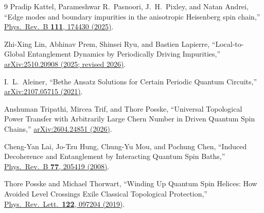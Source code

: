 \documentclass[10pt,a4paper]{article}
\begin{document}
\begin{thebibliography}{9}
Pradip Kattel, Parameshwar R.~Pasnoori, J.~H.~Pixley, and Natan Andrei,
``Edge modes and boundary impurities in the anisotropic Heisenberg spin chain,''
\href{https://doi.org/10.1103/PhysRevB.111.174430}{Phys.\ Rev.\ B \textbf{111}, 174430 (2025)}.

Zhi-Xing Lin, Abhinav Prem, Shinsei Ryu, and Bastien Lapierre,
``Local-to-Global Entanglement Dynamics by Periodically Driving Impurities,''
\href{https://arxiv.org/abs/2510.20908}{arXiv:2510.20908 (2025; revised 2026)}.

I.~L.~Aleiner, ``Bethe Ansatz Solutions for Certain Periodic Quantum Circuits,''
\href{https://arxiv.org/abs/2107.05715}{arXiv:2107.05715 (2021)}.

Anshuman Tripathi, Mircea Trif, and Thore Posske,
``Universal Topological Power Transfer with Arbitrarily Large Chern Number in Driven Quantum Spin Chains,''
\href{https://arxiv.org/abs/2604.24851}{arXiv:2604.24851 (2026)}.

Cheng-Yan Lai, Jo-Tzu Hung, Chung-Yu Mou, and Pochung Chen,
``Induced Decoherence and Entanglement by Interacting Quantum Spin Baths,''
\href{https://arxiv.org/abs/0803.0364}{Phys.\ Rev.\ B \textbf{77}, 205419 (2008)}.

Thore Posske and Michael Thorwart,
``Winding Up Quantum Spin Helices: How Avoided Level Crossings Exile Classical Topological Protection,''
\href{https://journals.aps.org/prl/abstract/10.1103/PhysRevLett.122.097204}{Phys.\ Rev.\ Lett.\ \textbf{122}, 097204 (2019)}.
\end{thebibliography}
\end{document}
